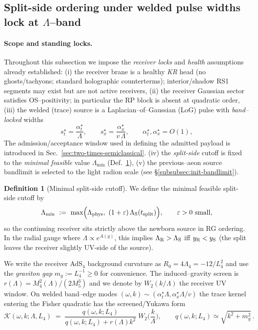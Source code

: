 \documentclass[10pt]{article}
\theoremstyle{definition}
\newtheorem{definition}{Definition}[section]
\theoremstyle{plain}
\begin{document}
\subsection{\texorpdfstring{Split-side ordering under welded pulse widths lock at $\Lambda$–band}{Split-side ordering under welded pulse widths lock at Lambda-band}}
\label{subsec:init-locked}

\paragraph{Scope and standing locks.}\label{par:uom-main-136}
Throughout this subsection we impose the \emph{receiver locks} and \emph{health} assumptions already established:
(i) the receiver brane is a healthy \emph{KR} head (no ghosts/tachyons; standard holographic counterterms);
interior/shadow RS1 segments may exist but are not active receivers,
(ii) the receiver Gaussian sector satisfies OS–positivity; in particular the RP block is absent at quadratic order,
(iii) the welded (trace) source is a Laplacian–of–Gaussian (LoG) pulse with \emph{band–locked} widths
\[
s_t^\star=\frac{\alpha_t^\star}{\Lambda},\qquad s_x^\star=\frac{\alpha_x^\star}{v\,\Lambda},\qquad
\alpha_t^\star,\alpha_x^\star=O(1),
\]
The admission/acceptance window used in defining the admitted payload is introduced in
Sec.~\ref{sec:two-times-semiclassical}.
(iv) the \emph{split-side} cutoff is fixed to the \emph{minimal feasible} value $\Lambda_{\min}$
(Def.~\ref{def:Lambda-min}),
(v) the previous–aeon source bandlimit is selected to the light radion scale (see \S\ref{subsubsec:init-bandlimit}).

\begin{definition}[Minimal split-side cutoff]\label{def:Lambda-min}
We define the minimal feasible split-side cutoff by
\[
\Lambda_{\min}\ :=\ \max\!\Big(\Lambda_{\rm phys},\ (1+\varepsilon)\,\Lambda_{\rm S}(t_{\rm split})\Big),
\qquad \varepsilon>0\ \text{small},
\]
so the continuing receiver sits strictly above the newborn source in RG ordering.
In the radial gauge where $\Lambda\propto e^{A(y)}$, this implies $\Lambda_{\rm R}>\Lambda_{\rm S}$ iff
$y_{\rm R}<y_{\rm S}$ (the split leaves the receiver slightly UV-side of the source).
\end{definition}

We write the receiver AdS$_4$ background curvature as $R_0=4\Lambda_4=-12/L_4^2$ and use
the \emph{graviton gap} $m_g:=L_4^{-1}\ge 0$ for convenience. The induced–gravity screen is
$r(\Lambda)=M_4^2(\Lambda)/(2M_5^3)$ and we denote by $W_2(k/\Lambda)$ the receiver UV window.
On welded band–edge modes $(\omega,k)\sim (\alpha_t^\star\Lambda,\alpha_x^\star\Lambda/v)$ the trace
kernel entering the Fisher quadratic has the screened/Yukawa form
\begin{equation}
\label{eq:trace-kernel}
\mathcal K(\omega,k;\Lambda,L_4)\;=\;\frac{q(\omega,k;L_4)}{q(\omega,k;L_4)+r(\Lambda)k^2}\;W_2\!\Big(\frac{k}{\Lambda}\Big),
\qquad
q(\omega,k;L_4)\simeq \sqrt{k^2+m_g^2}\,.
\end{equation}
\end{document}
